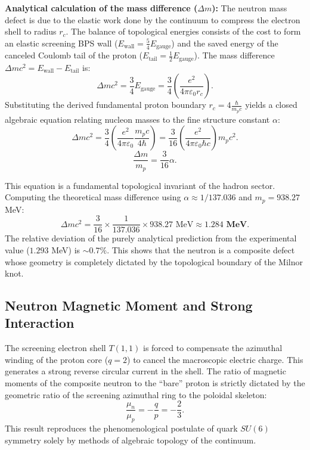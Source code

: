 \documentclass[11pt,a4paper]{article}
\begin{document}
\textbf{Analytical calculation of the mass difference ($\Delta m$):}
The neutron mass defect is due to the elastic work done by the continuum to compress the electron shell to radius $r_c$. The balance of topological energies consists of the cost to form an elastic screening BPS wall ($E_{\text{wall}} = \frac{5}{4} E_{\text{gauge}}$) and the saved energy of the canceled Coulomb tail of the proton ($E_{\text{tail}} = \frac{1}{2} E_{\text{gauge}}$).
The mass difference $\Delta m c^2 = E_{\text{wall}} - E_{\text{tail}}$ is:
\begin{equation}
\Delta m c^2 = \frac{3}{4} E_{\text{gauge}} = \frac{3}{4} \left( \frac{e^2}{4\pi\varepsilon_0 r_c} \right).
\end{equation}
Substituting the derived fundamental proton boundary $r_c = 4 \frac{\hbar}{m_p c}$ yields a closed algebraic equation relating nucleon masses to the fine structure constant $\alpha$:
\begin{equation}
\Delta m c^2 = \frac{3}{4} \left( \frac{e^2}{4\pi\varepsilon_0} \frac{m_p c}{4 \hbar} \right) = \frac{3}{16} \left( \frac{e^2}{4\pi\varepsilon_0 \hbar c} \right) m_p c^2.
\end{equation}
\begin{equation}
\frac{\Delta m}{m_p} = \frac{3}{16} \alpha.
\end{equation}

This equation is a fundamental topological invariant of the hadron sector. Computing the theoretical mass difference using $\alpha \approx 1/137.036$ and $m_p = 938.27$ MeV:
\begin{equation}
\Delta m c^2 = \frac{3}{16} \times \frac{1}{137.036} \times 938.27 \text{ MeV} \approx \mathbf{1.284 \text{ MeV}}.
\end{equation}
The relative deviation of the purely analytical prediction from the experimental value ($1.293$ MeV) is $\sim 0.7\%$. This shows that the neutron is a composite defect whose geometry is completely dictated by the topological boundary of the Milnor knot.

\subsection{Neutron Magnetic Moment and Strong Interaction}
The screening electron shell $T(1,1)$ is forced to compensate the azimuthal winding of the proton core ($q=2$) to cancel the macroscopic electric charge. This generates a strong reverse circular current in the shell. The ratio of magnetic moments of the composite neutron to the ``bare'' proton is strictly dictated by the geometric ratio of the screening azimuthal ring to the poloidal skeleton:
\begin{equation}
\frac{\mu_n}{\mu_p} = -\frac{q}{p} = -\frac{2}{3}.
\end{equation}
This result reproduces the phenomenological postulate of quark $SU(6)$ symmetry solely by methods of algebraic topology of the continuum.
\end{document}

